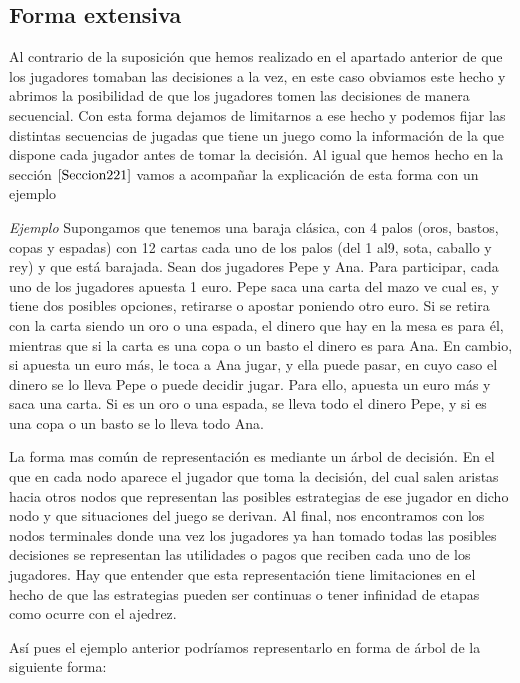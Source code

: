 \documentclass[12pt,a4paper,]{book}
\numberwithin{dummy}{section}
\theoremstyle{ocrenumbox}
\theoremstyle{blacknumex}
\theoremstyle{blacknumbox}
\theoremstyle{ocrenum}
\theoremstyle{ocrenum}
\begin{document}
\hypertarget{Seccion222}{%
\subsection{Forma extensiva}\label{Seccion222}}

Al contrario de la suposición que hemos realizado en el apartado
anterior de que los jugadores tomaban las decisiones a la vez, en este
caso obviamos este hecho y abrimos la posibilidad de que los jugadores
tomen las decisiones de manera secuencial. Con esta forma dejamos de
limitarnos a ese hecho y podemos fijar las distintas secuencias de
jugadas que tiene un juego como la información de la que dispone cada
jugador antes de tomar la decisión. Al igual que hemos hecho en la
sección \(\ref{Seccion221}\) vamos a acompañar la explicación de esta
forma con un ejemplo

\emph{Ejemplo} Supongamos que tenemos una baraja clásica, con 4 palos
(oros, bastos, copas y espadas) con 12 cartas cada uno de los palos (del
1 al9, sota, caballo y rey) y que está barajada. Sean dos jugadores Pepe
y Ana. Para participar, cada uno de los jugadores apuesta 1 euro. Pepe
saca una carta del mazo ve cual es, y tiene dos posibles opciones,
retirarse o apostar poniendo otro euro. Si se retira con la carta siendo
un oro o una espada, el dinero que hay en la mesa es para él, mientras
que si la carta es una copa o un basto el dinero es para Ana. En cambio,
si apuesta un euro más, le toca a Ana jugar, y ella puede pasar, en cuyo
caso el dinero se lo lleva Pepe o puede decidir jugar. Para ello,
apuesta un euro más y saca una carta. Si es un oro o una espada, se
lleva todo el dinero Pepe, y si es una copa o un basto se lo lleva todo
Ana.

La forma mas común de representación es mediante un árbol de decisión.
En el que en cada nodo aparece el jugador que toma la decisión, del cual
salen aristas hacia otros nodos que representan las posibles estrategias
de ese jugador en dicho nodo y que situaciones del juego se derivan. Al
final, nos encontramos con los nodos terminales donde una vez los
jugadores ya han tomado todas las posibles decisiones se representan las
utilidades o pagos que reciben cada uno de los jugadores. Hay que
entender que esta representación tiene limitaciones en el hecho de que
las estrategias pueden ser continuas o tener infinidad de etapas como
ocurre con el ajedrez.

Así pues el ejemplo anterior podríamos representarlo en forma de árbol
de la siguiente forma:
\end{document}
